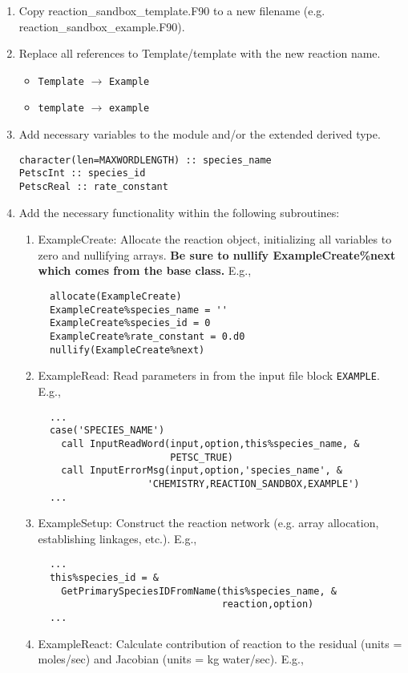 \begin{enumerate}
  \item Copy reaction\_sandbox\_template.F90 to a new filename (e.g. reaction\_sandbox\_example.F90).
  \item Replace all references to Template/template with the new reaction name.
    \begin{itemize}
      \item[] \verb+Template+ $\rightarrow$ \verb+Example+
      \item[] \verb+template+ $\rightarrow$ \verb+example+
    \end{itemize}
  \item Add necessary variables to the module and/or the extended derived type.
\begin{verbatim}
character(len=MAXWORDLENGTH) :: species_name
PetscInt :: species_id
PetscReal :: rate_constant
\end{verbatim}
  \item Add the necessary functionality within the following subroutines:
    \begin{enumerate}[label=\alph*]
      \item ExampleCreate: Allocate the reaction object, initializing all variables to zero and nullifying arrays.  {\bf Be sure to nullify ExampleCreate\%next which comes from the base class.}  E.g.,
  \begin{verbatim}
  allocate(ExampleCreate)
  ExampleCreate%species_name = ''
  ExampleCreate%species_id = 0
  ExampleCreate%rate_constant = 0.d0
  nullify(ExampleCreate%next)
  \end{verbatim}
      \item ExampleRead: Read parameters in from the input file block \verb+EXAMPLE+.  E.g.,
  \begin{verbatim}
  ...
  case('SPECIES_NAME')
    call InputReadWord(input,option,this%species_name, &
                       PETSC_TRUE)
    call InputErrorMsg(input,option,'species_name', &
                   'CHEMISTRY,REACTION_SANDBOX,EXAMPLE')
  ...
  \end{verbatim}
      \item ExampleSetup: Construct the reaction network (e.g. array allocation, establishing linkages, etc.). E.g.,
  \begin{verbatim}
  ...
  this%species_id = &
    GetPrimarySpeciesIDFromName(this%species_name, &
                                reaction,option)
  ...
  \end{verbatim}
      \item ExampleReact: Calculate contribution of reaction to the residual (units = moles/sec) and Jacobian (units = kg water/sec). E.g.,

\end{enumerate}
\end{enumerate}
